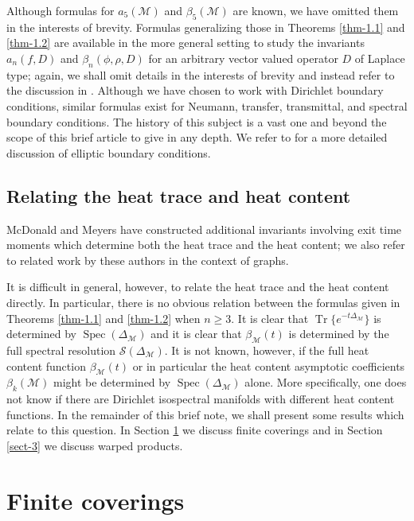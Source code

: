 \documentclass{amsart}
\begin{document}
Although formulas for $a_5(\mathcal{M})$ and $\beta_5(\mathcal{M})$ are known, we have
omitted them in the interests of brevity.  Formulas generalizing those in Theorems
\ref{thm-1.1} and
\ref{thm-1.2} are available in the more general setting to study the invariants
$a_n(f,D)$ and $\beta_n(\phi,\rho,D)$ for an arbitrary vector valued operator $D$ of Laplace type; again, we
shall omit details in the interests of brevity and instead refer to the discussion in
\cite{G04}. Although we have chosen to work with Dirichlet boundary conditions, similar formulas exist for
Neumann, transfer, transmittal, and spectral boundary conditions. The  history of this subject is a vast one
and beyond the scope of this brief article to give in any depth. We refer to \cite{Gru96} for a more detailed
discussion of elliptic boundary conditions.

\subsection{Relating the heat trace and heat content}
McDonald and Meyers \cite{MM03a} have constructed additional
invariants involving exit time moments which determine both the heat trace and the heat content; we also refer
to related work
\cite{MM03} by these authors in the context of graphs. 

It is difficult in general, however, to relate the
heat trace and the heat content directly. In particular, there is no obvious relation between the formulas
given in Theorems \ref{thm-1.1} and \ref{thm-1.2} when $n\ge3$. It is clear that
$\operatorname{Tr}\{e^{-t\Delta_{\mathcal{M}}}\}$ is determined by
$\operatorname{Spec}(\Delta_{\mathcal{M}})$ and it is clear that
$\beta_{\mathcal{M}}(t)$ is determined by the full spectral resolution $\mathcal{S}(\Delta_{\mathcal{M}})$. It is not known, 
however, if the full heat content function $\beta_{\mathcal{M}}(t)$ or in particular the
heat content asymptotic coefficients
$\beta_k(\mathcal{M})$ might be determined by $\operatorname{Spec}(\Delta_{\mathcal{M}})$ alone. More specifically, one
does not know if there are Dirichlet isospectral manifolds with different heat content functions.
In the remainder of this brief note, we shall present some results which relate to this question. In Section
\ref{sect-2} we discuss finite coverings and in Section \ref{sect-3} we discuss warped products.

\section{Finite coverings}\label{sect-2}
\end{document}
